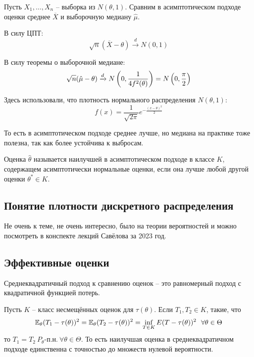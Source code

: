 \begin{example}
    Пусть $X_1, \dots, X_n$ -- выборка из $N(\theta, 1)$. Сравним в асимптотическом подходе оценки среднее $\overline{X}$ и выборочную медиану $\hat{\mu}$.

    В силу ЦПТ:
    \[
        \sqrt{n}(\overline{X} - \theta) \xrightarrow{d} N(0, 1)
    \]
    
    В силу теоремы о выборочной медиане:
    \[
        \sqrt{n}(\hat{\mu} - \theta) \xrightarrow{d} N\left(0, \frac{1}{4 f^2(\theta)}\right) = N\left(0, \frac{\pi}{2}\right)
    \]
    
    Здесь использовали, что плотность нормального распределения $N(\theta, 1)$:
     \[
        f(x) = \frac{1}{\sqrt{2 \pi}} e^{-\frac{(x-\theta)^2}{2}}
     \]

     То есть в асимптотическом подходе среднее лучше, но медиана на практике тоже полезна, так как более устойчива к выбросам.
\end{example}

\begin{definition}
    Оценка $\hat{\theta}$ называется наилучшей в асимптотическом подходе в классе $K$, содержащем асимптотически нормальные оценки, если она лучше любой другой оценки $\theta^* \in K$.
\end{definition}

\subsection{Понятие плотности дискретного распределения}

Не очень к теме, не очень интересно, было на теории вероятностей и можно посмотреть в конспекте лекций Савёлова за 2023 год.

\subsection{Эффективные оценки}

\begin{definition}
    Среднеквадратичный подход к сравнению оценок -- это равномерный подход с квадратичной функцией потерь.
\end{definition}

\begin{proposition}
    Пусть $K$ -- класс несмещённых оценок для $\tau(\theta)$. Если $T_1, T_2 \in K$, такие, что
    \[
        \mathbb{E}_\theta (T_1 - \tau(\theta))^2 = \mathbb{E}_\theta (T_2 - \tau(\theta))^2 = \inf_{T \in K} E(T - \tau(\theta))^2 \ \ \forall \theta \in \Theta
    \]
    то $T_1 = T_2 \ P_\theta\text{-п.н.} \ \forall \theta \in \Theta$. То есть наилучшая оценка в среднеквадратичном подходе единственна с точностью до множеств нулевой вероятности.
\end{proposition}

